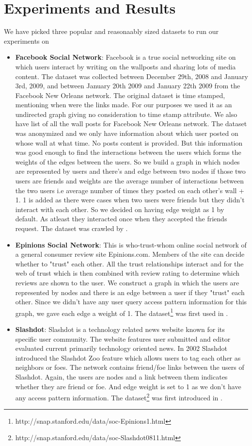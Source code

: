 \documentclass[letterpaper]{article}
\begin{document}
\section{Experiments and Results}
We have picked three popular and reasonaably sized datasets to run our experiments on
\begin{itemize}
\item \textbf{Facebook Social Network}: Facebook is a true social networking
site on which users interact by writing on the wallposts and sharing lots of
media content. The dataset was collected between December 29th, 2008 and
January 3rd, 2009, and between January 20th 2009 and January 22th 2009 from the
Facebook New Orleans network. The original dataset is time stamped, mentioning
when were the links made.  For our purposes we used it as an undirected graph
giving no consideration to time stamp attribute.  We also have list of all the
wall posts for Facebook New Orleans network. The dataset was anonymized and we
only have information about which user posted on whose wall at what time. No
posts content is provided. But this information was good enough to find the
interactions between the users which forms the weights of the edges between the
users.  So we build a graph in which nodes are represented by users and there's
and edge between two nodes if those two users are friends and weights are the
average number of interactions between the two users i.e average number of
times they posted on each other's wall + 1. 1 is added as there were cases when
two users were friends but they didn't interact with each other. So we decided
on having edge weight as 1 by default. As atleast they interacted once when
they accepted the friends request. The dataset was crawled by \cite{26}.

\item \textbf{Epinions Social Network}: This is who-trust-whom online social
network of a general consumer review site Epinions.com. Members of the site can
decide whether to "trust" each other.  All the trust relationships interact and
for the web of trust which is then combined with review rating to determine
which reviews are shown to the user. We construct a graph in which the users
are represented by nodes and there is an edge between a user if they "trust"
each other. Since we didn't have any user query access pattern information for
this graph, we gave each edge a weight of 1. The
dataset\footnote{http://snap.stanford.edu/data/soc-Epinions1.html} was first
used in \cite{epi2003}.

\item \textbf{Slashdot}: Slashdot is a technology related news website known
for its specific user community.  The website features user submitted and
editor evaluated current primarily technology oriented news.  In 2002 Slashdot
introduced the Slashdot Zoo feature which allows users to tag each other as
neighbors or foes.  The network contains friend/foe links between the users of
Slashdot. Again, the users are nodes and a link between them indicates whether
they are friend or foe. And edge weight is set to 1 as we don't have any access
pattern information. The
dataset\footnote{http://snap.stanford.edu/data/soc-Slashdot0811.html} was first
introduced in \cite{25}.


\end{itemize}
\end{document}
